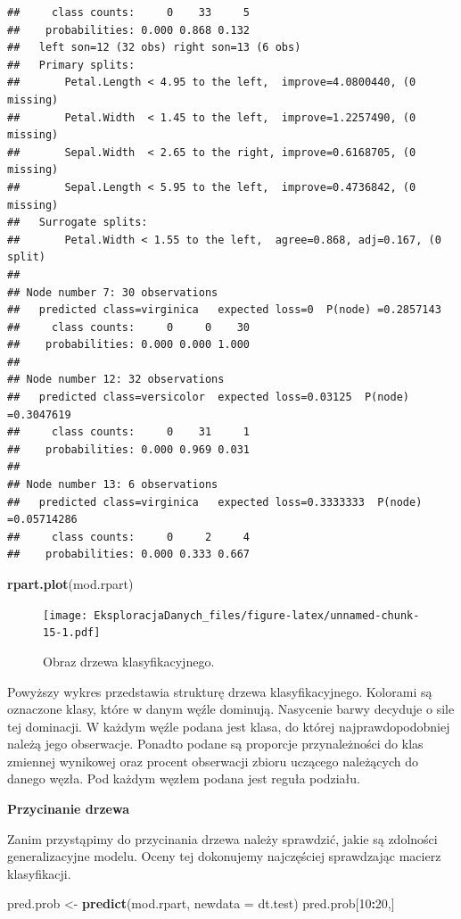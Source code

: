 \documentclass[]{book}
\newenvironment{Shaded}{\begin{snugshade}}{\end{snugshade}}
\newcommand{\DataTypeTok}[1]{\textcolor[rgb]{0.13,0.29,0.53}{#1}}
\newcommand{\DecValTok}[1]{\textcolor[rgb]{0.00,0.00,0.81}{#1}}
\newcommand{\KeywordTok}[1]{\textcolor[rgb]{0.13,0.29,0.53}{\textbf{#1}}}
\newcommand{\NormalTok}[1]{#1}
\newcommand{\OperatorTok}[1]{\textcolor[rgb]{0.81,0.36,0.00}{\textbf{#1}}}
\newcommand{\StringTok}[1]{\textcolor[rgb]{0.31,0.60,0.02}{#1}}
\theoremstyle{plain}
\theoremstyle{definition}
\theoremstyle{definition}
\theoremstyle{definition}
\theoremstyle{definition}
\theoremstyle{remark}
\begin{document}
\begin{verbatim}
##     class counts:     0    33     5
##    probabilities: 0.000 0.868 0.132 
##   left son=12 (32 obs) right son=13 (6 obs)
##   Primary splits:
##       Petal.Length < 4.95 to the left,  improve=4.0800440, (0 missing)
##       Petal.Width  < 1.45 to the left,  improve=1.2257490, (0 missing)
##       Sepal.Width  < 2.65 to the right, improve=0.6168705, (0 missing)
##       Sepal.Length < 5.95 to the left,  improve=0.4736842, (0 missing)
##   Surrogate splits:
##       Petal.Width < 1.55 to the left,  agree=0.868, adj=0.167, (0 split)
## 
## Node number 7: 30 observations
##   predicted class=virginica   expected loss=0  P(node) =0.2857143
##     class counts:     0     0    30
##    probabilities: 0.000 0.000 1.000 
## 
## Node number 12: 32 observations
##   predicted class=versicolor  expected loss=0.03125  P(node) =0.3047619
##     class counts:     0    31     1
##    probabilities: 0.000 0.969 0.031 
## 
## Node number 13: 6 observations
##   predicted class=virginica   expected loss=0.3333333  P(node) =0.05714286
##     class counts:     0     2     4
##    probabilities: 0.000 0.333 0.667
\end{verbatim}

\begin{Shaded}
\begin{Highlighting}[]
\KeywordTok{rpart.plot}\NormalTok{(mod.rpart)}
\end{Highlighting}
\end{Shaded}

\begin{figure}
\centering
\texttt{[image: EksploracjaDanych\_files/figure-latex/unnamed-chunk-15-1.pdf]}
\caption{\label{fig:unnamed-chunk-15}Obraz drzewa klasyfikacyjnego.}
\end{figure}

Powyższy wykres przedstawia strukturę drzewa klasyfikacyjnego. Kolorami są oznaczone klasy, które w danym węźle dominują. Nasycenie barwy decyduje o sile tej dominacji. W każdym węźle podana jest klasa, do której najprawdopodobniej należą jego obserwacje. Ponadto podane są proporcje przynależności do klas zmiennej wynikowej oraz procent obserwacji zbioru uczącego należących do danego węzła. Pod każdym węzłem podana jest reguła podziału.

\textbf{Przycinanie drzewa}

Zanim przystąpimy do przycinania drzewa należy sprawdzić, jakie są zdolności generalizacyjne modelu. Oceny tej dokonujemy najczęściej sprawdzając macierz klasyfikacji.

\begin{Shaded}
\begin{Highlighting}[]
\NormalTok{pred.prob <-}\StringTok{ }\KeywordTok{predict}\NormalTok{(mod.rpart, }
                     \DataTypeTok{newdata =}\NormalTok{ dt.test)}
\NormalTok{pred.prob[}\DecValTok{10}\OperatorTok{:}\DecValTok{20}\NormalTok{,]}
\end{Highlighting}
\end{Shaded}
\end{document}
